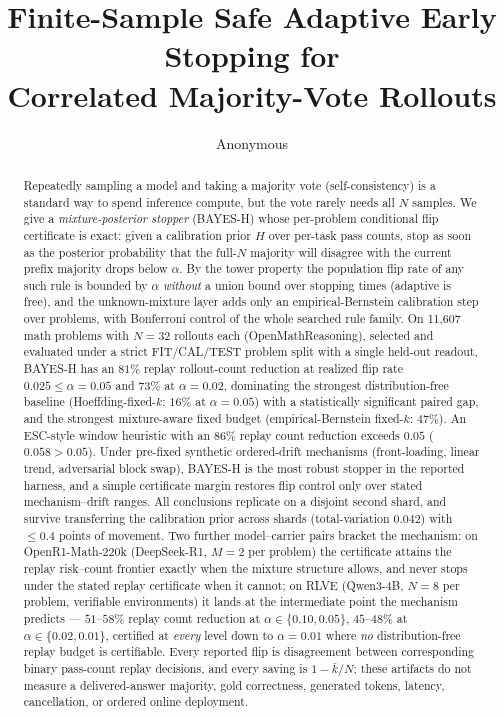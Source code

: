 \documentclass{article}
\title{Finite-Sample Safe Adaptive Early Stopping for\\
Correlated Majority-Vote Rollouts}
\author{Anonymous}
\date{}
\theoremstyle{definition}
\theoremstyle{remark}
\begin{document}
\maketitle

\begin{abstract}
Repeatedly sampling a model and taking a majority vote (self-consistency) is a
standard way to spend inference compute, but the vote rarely needs all $N$
samples. We give a
\emph{mixture-posterior stopper} (BAYES-H) whose per-problem conditional flip
certificate is exact: given a calibration prior $H$ over per-task pass counts,
stop as soon as the posterior probability that the full-$N$ majority will
disagree with the current prefix majority drops below $\alpha$. By the tower
property the population flip rate of any such rule is bounded by $\alpha$
\emph{without} a union bound over stopping times (adaptive is free), and the
unknown-mixture layer adds only an empirical-Bernstein calibration step over
problems, with Bonferroni control of the whole searched rule family.
On 11{,}607 math problems with $N=32$ rollouts each (OpenMathReasoning),
selected and evaluated under a strict FIT/CAL/TEST problem split with a single
held-out readout, BAYES-H has an $81\%$ replay rollout-count reduction at realized flip rate
$0.025\le\alpha=0.05$ and $73\%$ at $\alpha=0.02$, dominating the strongest
distribution-free baseline (Hoeffding-fixed-$k$: $16\%$ at $\alpha=0.05$) with
a statistically significant paired gap, and the strongest mixture-aware fixed
budget (empirical-Bernstein fixed-$k$: $47\%$). An ESC-style window heuristic
with an $86\%$ replay count reduction exceeds $0.05$ ($0.058>0.05$). Under
pre-fixed synthetic ordered-drift mechanisms (front-loading, linear trend,
adversarial block swap), BAYES-H is the most robust stopper in the reported
harness, and a simple certificate margin restores flip control only over
stated mechanism--drift ranges.
All conclusions replicate on a disjoint second shard, and survive transferring
the calibration prior across shards (total-variation $0.042$) with $\le0.4$
points of movement. Two further model--carrier pairs bracket the mechanism:
on OpenR1-Math-220k (DeepSeek-R1, $M=2$ per problem) the certificate attains
the replay risk--count frontier exactly when the mixture structure allows, and
never stops under the stated replay certificate when it cannot; on RLVE
(Qwen3-4B, $N=8$ per problem, verifiable environments) it
lands at the intermediate point the mechanism predicts --- $51$--$58\%$
replay count reduction at $\alpha\in\{0.10,0.05\}$, $45$--$48\%$ at
$\alpha\in\{0.02,0.01\}$, certified at \emph{every} level down to
$\alpha=0.01$ where \emph{no} distribution-free replay budget is certifiable.
Every reported flip is disagreement between corresponding binary pass-count
replay decisions, and every saving is $1-\bar k/N$; these artifacts do not
measure a delivered-answer majority, gold correctness, generated tokens,
latency, cancellation, or ordered online deployment.
\end{abstract}
\end{document}
